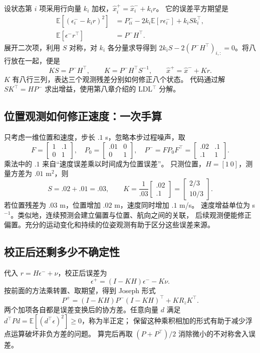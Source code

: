 设状态第 $i$ 项采用行向量 $k_i$ 加权，$\hat x_i^+=\hat x_i^-+k_ir$。
它的误差平方期望是
\begin{align}
\mathbb E[(\epsilon_i^--k_ir)^2]
&=P^-_{ii}-2k_i\mathbb E[r\epsilon_i^-]+k_i S k_i^\top,\\
\mathbb E[\epsilon^- r^\top]&=P^-H^\top.
\end{align}
展开二次项，利用 $S$ 对称，对 $k_i$ 各分量求导得到
$2k_iS-2(P^-H^\top)_{i,:}=0$。将八行放在一起，便是
\begin{equation}
KS=P^-H^\top,\qquad K=P^-H^\top S^{-1},\qquad
\hat x^+=\hat x^-+Kr.
\end{equation}
$K$ 有八行三列，表达三个观测残差分别如何修正八个状态。
代码通过解 $SK^\top=HP^-$ 求出增益，使用第八章介绍的 LDL$^\top$ 分解。

\subsection{位置观测如何修正速度：一次手算}
只考虑一维位置和速度，步长 $.1$ s，忽略本步过程噪声，取
\begin{equation}
F=\begin{bmatrix}1&.1\\0&1\end{bmatrix},\quad
P_0=\begin{bmatrix}.01&0\\0&1\end{bmatrix},\quad
P^-=FP_0F^\top=\begin{bmatrix}.02&.1\\.1&1\end{bmatrix}.
\end{equation}
乘法中的 $.1$ 来自“速度误差乘以时间成为位置误差”。
只测位置，$H=[1\ 0]$，测量方差为 $.01$ m$^2$，则
\begin{equation}
S=.02+.01=.03,\qquad K=\frac1{.03}\begin{bmatrix}.02\\.1\end{bmatrix}
=\begin{bmatrix}2/3\\10/3\end{bmatrix}.
\end{equation}
若位置残差为 $.03$ m，位置增加 $.02$ m，速度同时增加 $.1$ m/s。
速度增益单位为 s$^{-1}$。类似地，连续预测会建立偏置与位置、航向之间的关联，
后续观测便能修正偏置。充分的运动变化和持续的位姿观测有助于区分这些误差来源。

\subsection{校正后还剩多少不确定性}
代入 $r=H\epsilon^-+\nu$，校正后误差为
\begin{equation}
\epsilon^+=(I-KH)\epsilon^--K\nu.
\end{equation}
按前面的方法乘转置、取期望，得到 Joseph 形式
\begin{equation}
P^+=(I-KH)P^-(I-KH)^\top+KR_zK^\top.
\end{equation}
两个加项各自都是误差变换后的协方差。任意向量 $d$ 满足
$d^\top P d=\mathbb E[(d^\top\epsilon)^2]\geq0$，称为半正定；
保留这种乘积相加的形式有助于减少浮点运算破坏非负方差的问题。
算完后再取 $(P+P^\top)/2$ 消除微小的不对称舍入误差。

